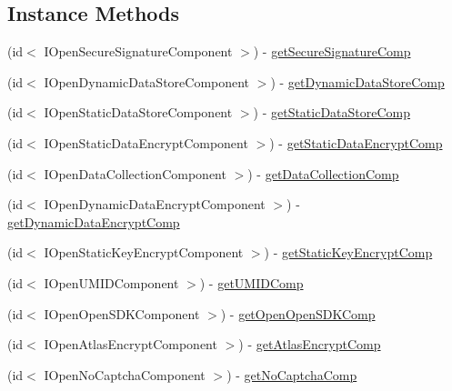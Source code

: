 \subsection*{Instance Methods}
\begin{DoxyCompactItemize}
\item 
(id$<$ I\+Open\+Secure\+Signature\+Component $>$) -\/ \mbox{\hyperlink{interface_open_security_guard_manager_aa4def335963b752d07653c4df25d8a52}{get\+Secure\+Signature\+Comp}}
\item 
(id$<$ I\+Open\+Dynamic\+Data\+Store\+Component $>$) -\/ \mbox{\hyperlink{interface_open_security_guard_manager_aea773ff65ec2d8bc83dfb55c8421f846}{get\+Dynamic\+Data\+Store\+Comp}}
\item 
(id$<$ I\+Open\+Static\+Data\+Store\+Component $>$) -\/ \mbox{\hyperlink{interface_open_security_guard_manager_af2364a7cca5c0964b9b7fce44d3a13dd}{get\+Static\+Data\+Store\+Comp}}
\item 
(id$<$ I\+Open\+Static\+Data\+Encrypt\+Component $>$) -\/ \mbox{\hyperlink{interface_open_security_guard_manager_a94900352c38aee0776b8f007d73a6cf4}{get\+Static\+Data\+Encrypt\+Comp}}
\item 
(id$<$ I\+Open\+Data\+Collection\+Component $>$) -\/ \mbox{\hyperlink{interface_open_security_guard_manager_add8fec4ef1682782cd1ab2745deea1f4}{get\+Data\+Collection\+Comp}}
\item 
(id$<$ I\+Open\+Dynamic\+Data\+Encrypt\+Component $>$) -\/ \mbox{\hyperlink{interface_open_security_guard_manager_af538971a8cb1178e9cb7797bb775f67b}{get\+Dynamic\+Data\+Encrypt\+Comp}}
\item 
(id$<$ I\+Open\+Static\+Key\+Encrypt\+Component $>$) -\/ \mbox{\hyperlink{interface_open_security_guard_manager_a5f6ae595ea5fd9350b0d64aab152f0f4}{get\+Static\+Key\+Encrypt\+Comp}}
\item 
(id$<$ I\+Open\+U\+M\+I\+D\+Component $>$) -\/ \mbox{\hyperlink{interface_open_security_guard_manager_af7be40992f6e3cd38bf881f5f4eaba58}{get\+U\+M\+I\+D\+Comp}}
\item 
(id$<$ I\+Open\+Open\+S\+D\+K\+Component $>$) -\/ \mbox{\hyperlink{interface_open_security_guard_manager_a3aaa6e6cf85653c500b005faccd90af1}{get\+Open\+Open\+S\+D\+K\+Comp}}
\item 
(id$<$ I\+Open\+Atlas\+Encrypt\+Component $>$) -\/ \mbox{\hyperlink{interface_open_security_guard_manager_ad62d9e47e2d2185c0b8f619671b841a0}{get\+Atlas\+Encrypt\+Comp}}
\item 
(id$<$ I\+Open\+No\+Captcha\+Component $>$) -\/ \mbox{\hyperlink{interface_open_security_guard_manager_afa2af267e86bbd49b231cfc8018360c5}{get\+No\+Captcha\+Comp}}

\end{DoxyCompactItemize}
